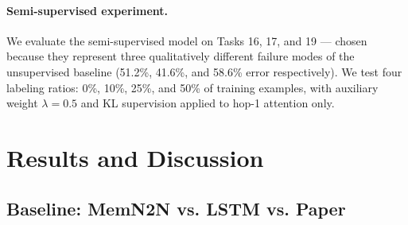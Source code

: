 \documentclass{article} %
\begin{document}
\paragraph{Semi-supervised experiment.}
We evaluate the semi-supervised model on Tasks 16, 17, and 19 --- chosen because they represent three qualitatively different failure modes of the unsupervised baseline (51.2\%, 41.6\%, and 58.6\% error respectively). We test four labeling ratios: 0\%, 10\%, 25\%, and 50\% of training examples, with auxiliary weight $\lambda = 0.5$ and KL supervision applied to hop-1 attention only.


\section{Results and Discussion}
\label{sec:results}

\subsection{Baseline: MemN2N vs. LSTM vs. Paper}
\end{document}
